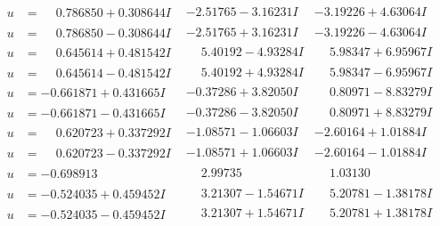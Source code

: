 \documentclass[1p]{elsarticle_modified}
\theoremstyle{definition}
\begin{document}
$$\begin{array}{c|c|c}
\begin{aligned}
u &= \phantom{-}0.786850 + 0.308644 I\end{aligned}
 & -2.51765 - 3.16231 I & -3.19226 + 4.63064 I \\ \hline\begin{aligned}
u &= \phantom{-}0.786850 - 0.308644 I\end{aligned}
 & -2.51765 + 3.16231 I & -3.19226 - 4.63064 I \\ \hline\begin{aligned}
u &= \phantom{-}0.645614 + 0.481542 I\end{aligned}
 & \phantom{-}5.40192 - 4.93284 I & \phantom{-}5.98347 + 6.95967 I \\ \hline\begin{aligned}
u &= \phantom{-}0.645614 - 0.481542 I\end{aligned}
 & \phantom{-}5.40192 + 4.93284 I & \phantom{-}5.98347 - 6.95967 I \\ \hline\begin{aligned}
u &= -0.661871 + 0.431665 I\end{aligned}
 & -0.37286 + 3.82050 I & \phantom{-}0.80971 - 8.83279 I \\ \hline\begin{aligned}
u &= -0.661871 - 0.431665 I\end{aligned}
 & -0.37286 - 3.82050 I & \phantom{-}0.80971 + 8.83279 I \\ \hline\begin{aligned}
u &= \phantom{-}0.620723 + 0.337292 I\end{aligned}
 & -1.08571 - 1.06603 I & -2.60164 + 1.01884 I \\ \hline\begin{aligned}
u &= \phantom{-}0.620723 - 0.337292 I\end{aligned}
 & -1.08571 + 1.06603 I & -2.60164 - 1.01884 I \\ \hline\begin{aligned}
u &= -0.698913\phantom{ +0.000000I}\end{aligned}
 & \phantom{-}2.99735\phantom{ +0.000000I} & \phantom{-}1.03130\phantom{ +0.000000I} \\ \hline\begin{aligned}
u &= -0.524035 + 0.459452 I\end{aligned}
 & \phantom{-}3.21307 - 1.54671 I & \phantom{-}5.20781 - 1.38178 I \\ \hline\begin{aligned}
u &= -0.524035 - 0.459452 I\end{aligned}
 & \phantom{-}3.21307 + 1.54671 I & \phantom{-}5.20781 + 1.38178 I \\ \hline\begin{aligned}

\end{aligned}
\end{array}$$
\end{document}
